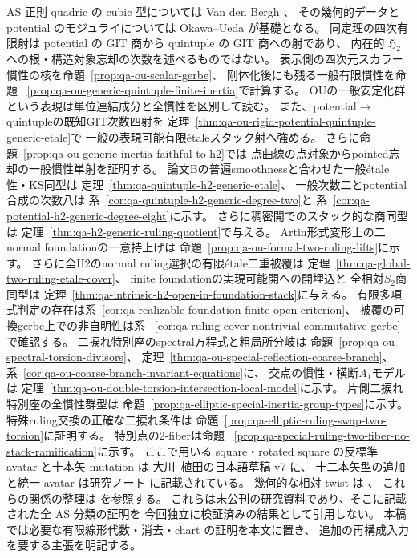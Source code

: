 \documentclass[a4paper,11pt]{ltjsarticle}
\numberwithin{equation}{section}
\theoremstyle{plain}
\theoremstyle{definition}
\theoremstyle{remark}
\newcommand{\HHstack}{\mathfrak H_2}
\begin{document}
AS 正則 quadric の cubic 型については Van den Bergh \cite{VdB2011}、
その幾何的データと potential のモジュライについては
Okawa--Ueda \cite[Theorem 1.1]{OU2014} が基礎となる。
同定理の四次有限射は potential の GIT 商から quintuple の GIT 商への射であり、
内在的 $\HHstack$ への根・構造対象忘却の次数を述べるものではない。
表示側の四次元スカラー慣性の核を命題~\ref{prop:qa-ou-scalar-gerbe}、
剛体化後にも残る一般有限慣性を命題
~\ref{prop:qa-ou-generic-quintuple-finite-inertia}で計算する。
OUの一般安定化群という表現は単位連結成分と全慣性を区別して読む。
また、potential$\to$quintupleの既知GIT次数四射を
定理~\ref{thm:qa-ou-rigid-potential-quintuple-generic-etale}で
一般の表現可能有限étaleスタック射へ強める。
さらに命題~\ref{prop:qa-ou-generic-inertia-faithful-to-h2}では
点曲線の点対象からpointed忘却の一般慣性単射を証明する。
論文Bの普遍smoothnessと合わせた一般étale性・KS同型は
定理~\ref{thm:qa-quintuple-h2-generic-etale}、
一般次数二とpotential合成の次数八は
系~\ref{cor:qa-quintuple-h2-generic-degree-two}と
系~\ref{cor:qa-potential-h2-generic-degree-eight}に示す。
さらに稠密開でのスタック的な商同型は
定理~\ref{thm:qa-h2-generic-ruling-quotient}で与える。
Artin形式変形上の二normal foundationの一意持上げは
命題~\ref{prop:qa-ou-formal-two-ruling-lifts}に示す。
さらに全H2のnormal ruling選択の有限étale二重被覆は
定理~\ref{thm:qa-global-two-ruling-etale-cover}、
finite foundationの実現可能開への開埋込と
全相対$S_2$商同型は
定理~\ref{thm:qa-intrinsic-h2-open-in-foundation-stack}に与える。
有限多項式判定の存在は系~\ref{cor:qa-realizable-foundation-finite-open-criterion}、
被覆の可換gerbe上での非自明性は系
~\ref{cor:qa-ruling-cover-nontrivial-commutative-gerbe}で確認する。
二捩れ特別座のspectral方程式と粗局所分岐は
命題~\ref{prop:qa-ou-spectral-torsion-divisors}、
定理~\ref{thm:qa-ou-special-reflection-coarse-branch}、
系~\ref{cor:qa-ou-coarse-branch-invariant-equations}に、
交点の慣性・横断$A_1$モデルは
定理~\ref{thm:qa-ou-double-torsion-intersection-local-model}に示す。
片側二捩れ特別座の全慣性群型は
命題~\ref{prop:qa-elliptic-special-inertia-group-types}に示す。
特殊ruling交換の正確な二捩れ条件は
命題~\ref{prop:qa-elliptic-ruling-swap-two-torsion}に証明する。
特別点の2-fiberは命題
~\ref{prop:qa-special-ruling-two-fiber-no-stack-ramification}に示す。
ここで用いる square・rotated square の反標準 avatar と十本矢 mutation は
大川--植田の日本語草稿 v7 \cite{AvatarVSeven2026} に、
十二本矢型の追加と統一 avatar は研究ノート \cite{Q12Avatar2026} に記載されている。
幾何的な相対 twist は \cite{Q12Weyl2026}、
これらの関係の整理は \cite{Synthesis2026} を参照する。
これらは未公刊の研究資料であり、そこに記載された全 AS 分類の証明を
今回独立に検証済みの結果として引用しない。
本稿では必要な有限線形代数・消去・chart の証明を本文に置き、
追加の再構成入力を要する主張を明記する。
\end{document}
